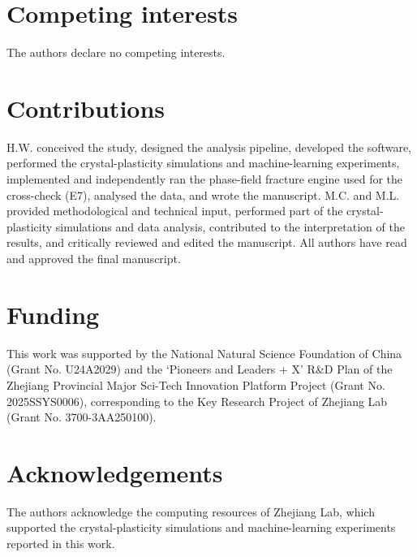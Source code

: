 \documentclass[11pt]{article}
\begin{document}
\section{Competing interests}

The authors declare no competing interests.

\section{Contributions}

H.W. conceived the study, designed the analysis pipeline, developed the software, performed the crystal-plasticity simulations and machine-learning experiments, implemented and independently ran the phase-field fracture engine used for the cross-check (E7), analysed the data, and wrote the manuscript. M.C. and M.L. provided methodological and technical input, performed part of the crystal-plasticity simulations and data analysis, contributed to the interpretation of the results, and critically reviewed and edited the manuscript. All authors have read and approved the final manuscript.

\section{Funding}

This work was supported by the National Natural Science Foundation of China (Grant No. U24A2029) and the `Pioneers and Leaders + X' R\&D Plan of the Zhejiang Provincial Major Sci-Tech Innovation Platform Project (Grant No. 2025SSYS0006), corresponding to the Key Research Project of Zhejiang Lab (Grant No. 3700-3AA250100).

\section{Acknowledgements}

The authors acknowledge the computing resources of Zhejiang Lab, which supported the crystal-plasticity simulations and machine-learning experiments reported in this work.
\end{document}
